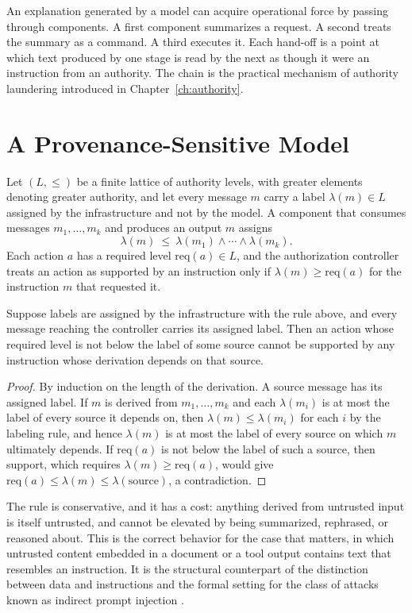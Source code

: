 An explanation generated by a model can acquire operational force by passing through components. A first component summarizes a request. A second treats the summary as a command. A third executes it. Each hand-off is a point at which text produced by one stage is read by the next as though it were an instruction from an authority. The chain is the practical mechanism of authority laundering introduced in Chapter~\ref{ch:authority}.

\section{A Provenance-Sensitive Model}

Let $(L,\le)$ be a finite lattice of authority levels, with greater elements denoting greater authority, and let every message $m$ carry a label $\lambda(m)\in L$ assigned by the infrastructure and not by the model. A component that consumes messages $m_1,\dots,m_k$ and produces an output $m$ assigns
\[
\lambda(m)\ \le\ \lambda(m_1)\wedge\cdots\wedge\lambda(m_k).
\]
Each action $a$ has a required level $\mathrm{req}(a)\in L$, and the authorization controller treats an action as supported by an instruction only if $\lambda(m)\ge\mathrm{req}(a)$ for the instruction $m$ that requested it.

\begin{proposition}\label{prop:no-elevation}
Suppose labels are assigned by the infrastructure with the rule above, and every message reaching the controller carries its assigned label. Then an action whose required level is not below the label of some source cannot be supported by any instruction whose derivation depends on that source.
\end{proposition}

\begin{proof}
By induction on the length of the derivation. A source message has its assigned label. If $m$ is derived from $m_1,\dots,m_k$ and each $\lambda(m_i)$ is at most the label of every source it depends on, then $\lambda(m)\le\lambda(m_i)$ for each $i$ by the labeling rule, and hence $\lambda(m)$ is at most the label of every source on which $m$ ultimately depends. If $\mathrm{req}(a)$ is not below the label of such a source, then support, which requires $\lambda(m)\ge\mathrm{req}(a)$, would give $\mathrm{req}(a)\le\lambda(m)\le\lambda(\text{source})$, a contradiction.
\end{proof}

The rule is conservative, and it has a cost: anything derived from untrusted input is itself untrusted, and cannot be elevated by being summarized, rephrased, or reasoned about. This is the correct behavior for the case that matters, in which untrusted content embedded in a document or a tool output contains text that resembles an instruction. It is the structural counterpart of the distinction between data and instructions and the formal setting for the class of attacks known as indirect prompt injection \cite{greshake2023}.

